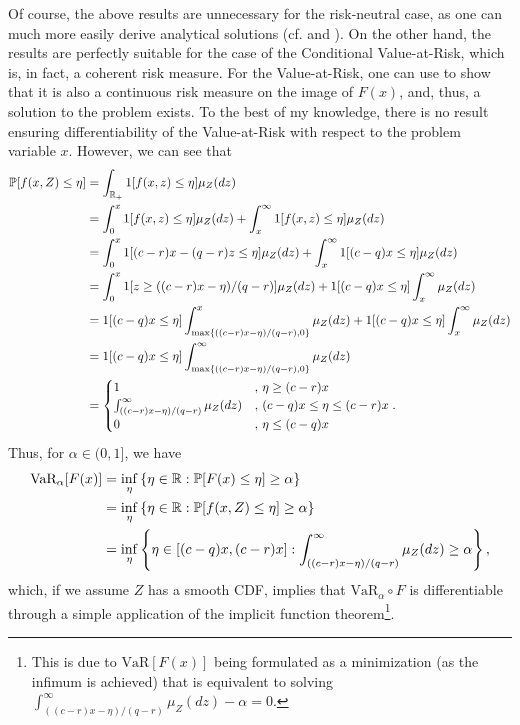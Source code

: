 \documentclass[12pt]{article}
\begin{document}
Of course, the above results are unnecessary for the risk-neutral case, as one can much more easily derive analytical solutions (cf. \citet[Chapter~1.e]{birgeIntroductionStochasticProgramming2011} and \citet[Chapter~1.2.1]{shapiroLecturesStochasticProgramming2009}).
On the other hand, the results are perfectly suitable for the case of the Conditional Value-at-Risk, which is, in fact, a coherent risk measure.
For the Value-at-Risk, one can use \citet[Theorem~2]{ivanovBilevelStochasticLinear2014} to show that it is also a continuous risk measure on the image of $F(x)$, and, thus, a solution to the problem exists.
To the best of my knowledge, there is no result ensuring differentiability of the Value-at-Risk with respect to the problem variable $x$.
However, we can see that
\begin{align*}
    \mathbb{P}[ f(x,Z) \le \eta] &= \int_{\mathbb{R}_{+}} 1[f(x,z) \le \eta] \mu_Z(dz) \\
    &= \int_{0}^{x} 1[f(x,z) \le \eta] \mu_Z(dz) + \int_{x}^{\infty} 1[f(x,z) \le \eta] \mu_Z(dz) \\
    &= \int_{0}^{x} 1[(c-r)x - (q-r)z \le \eta] \mu_Z(dz) + \int_{x}^{\infty} 1[(c-q)x \le \eta] \mu_Z(dz) \\
    &= \int_{0}^{x} 1[z \ge ((c-r)x - \eta) / (q-r)] \mu_Z(dz) + 1[(c-q)x \le \eta] \int_{x}^{\infty} \mu_Z(dz) \\
    &= 1[(c-q)x \le \eta] \int_{\max\{((c-r)x - \eta) / (q-r),0\}}^{x} \mu_Z(dz) + 1[(c-q)x \le \eta] \int_{x}^{\infty} \mu_Z(dz) \\
    &= 1[(c-q)x \le \eta] \int_{\max\{((c-r)x - \eta) / (q-r),0\}}^{\infty} \mu_Z(dz) \\
    &= \begin{cases}
	1 &,\, \eta \ge (c-r)x  \\
	\int_{((c-r)x - \eta) / (q-r)}^{\infty} \mu_Z(dz)  &,\, (c-q)x \le \eta \le  (c-r)x \\
	0  &,\, \eta \le (c-q)x
    \end{cases}
.\end{align*}
Thus, for $\alpha \in (0,1]$, we have 
\begin{align*}
    \text{VaR}_{\alpha}[F(x)] &= \inf_{\eta}\left\{ \eta \in \mathbb{R} : \mathbb{P}[ F(x) \le \eta] \ge \alpha  \right\} \\
    &= \inf_{\eta}\left\{ \eta \in \mathbb{R} : \mathbb{P}[ f(x,Z) \le \eta] \ge \alpha  \right\} \\
    &= \inf_{\eta}\left\{ \eta \in [(c-q)x,(c-r)x] : \int_{((c-r)x - \eta) / (q-r)}^{\infty} \mu_Z(dz) \ge \alpha   \right\}
,\end{align*} 
which, if we assume $Z$ has a smooth CDF, implies that $\text{VaR}_\alpha \circ F$ is differentiable through a simple application of the implicit function theorem\footnote{This is due to $\text{VaR}[F(x)]$ being formulated as a minimization (as the infimum is achieved) that is equivalent to solving $\int_{((c-r)x - \eta) / (q-r)}^{\infty} \mu_Z(dz) - \alpha = 0$.}.
\end{document}
